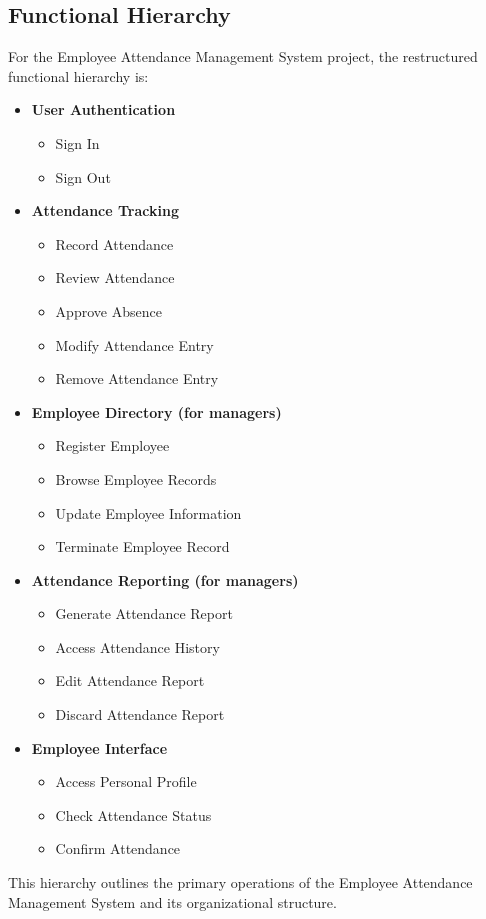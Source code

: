 \documentclass[a4paper, 12pt]{article}
\begin{document}
\subsection{Functional Hierarchy}
For the Employee Attendance Management System project, the restructured functional hierarchy is:
\begin{itemize}
    \item \textbf{User Authentication}
    \begin{itemize}
        \item Sign In
        \item Sign Out
    \end{itemize}
    \item \textbf{Attendance Tracking}
    \begin{itemize}
        \item Record Attendance
        \item Review Attendance
        \item Approve Absence
        \item Modify Attendance Entry
        \item Remove Attendance Entry
    \end{itemize}
    \item \textbf{Employee Directory (for managers)}
    \begin{itemize}
        \item Register Employee
        \item Browse Employee Records
        \item Update Employee Information
        \item Terminate Employee Record
    \end{itemize}
    \item \textbf{Attendance Reporting (for managers)}
    \begin{itemize}
        \item Generate Attendance Report
        \item Access Attendance History
        \item Edit Attendance Report
        \item Discard Attendance Report
    \end{itemize}
    \item \textbf{Employee Interface}
    \begin{itemize}
        \item Access Personal Profile
        \item Check Attendance Status
        \item Confirm Attendance
    \end{itemize}
\end{itemize}
This hierarchy outlines the primary operations of the Employee Attendance Management System and its organizational structure.
\end{document}
